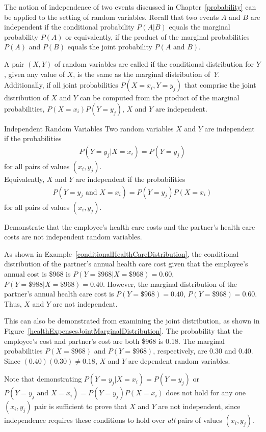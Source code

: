 The notion of independence of two events discussed in Chapter~\ref{probability} can be applied to the setting of random variables. Recall that two events $A$ and $B$ are independent if the conditional probability $P(A|B)$ equals the marginal probability $P(A)$ or equivalently, if the product of the marginal probabilities $P(A)$ and $P(B)$ equals the joint probability $P(A \text{ and }B)$.

A pair $(X,Y)$ of random variables are called  if the conditional distribution for $Y$, given any value of $X$, is the same as the marginal distribution of~$Y$. Additionally, if all joint probabilities $P(X = x_i, Y = y_j)$ that comprise the joint distribution of $X$ and $Y$ can be computed from the product of the marginal probabilities, $P(X = x_i)P(Y = y_j)$, $X$ and $Y$ are independent.

\begin{onebox}{Independent Random Variables}
Two random variables $X$ and $Y$ are independent if the probabilities
\begin{align*}
P(Y = y_j| X = x_i) = P(Y = y_j)
\end{align*}
for all pairs of values $(x_i,y_j)$. \\
Equivalently, $X$ and $Y$ are independent if the probabilities
\begin{align*}
P(Y = y_j \text{ and } X = x_i) = P(Y = y_j)P(X = x_i)
\end{align*}
for all pairs of values $(x_i,y_j)$.
\end{onebox}

\begin{examplewrap}
\begin{nexample}{Demonstrate that the employee's health care costs and the partner's health care costs are not independent random variables.}
	
	As shown in Example~\ref{conditionalHealthCareDistribution}, the conditional distribution of the partner's annual health care cost given that the employee's annual cost is \$968 is $P(Y = \$968 | X = \$ 968) = 0.60$, $P(Y = \$988 | X = \$ 968) = 0.40$. However, the marginal distribution of the partner's annual health care cost is $P(Y = \$968) = 0.40$, $P(Y = \$968) = 0.60$. Thus, $X$ and $Y$ are not independent.
	
	This can also be demonstrated from examining the joint distribution, as shown in Figure~\ref{healthExpensesJointMarginalDistribution}. The probability that the employee's cost and partner's cost are both \$968 is 0.18. The marginal probabilities $P(X = \$968)$ and $P(Y = \$968)$, respectively, are 0.30 and 0.40. Since $(0.40)(0.30) \neq 0.18$, $X$ and $Y$ are dependent random variables.
	
	Note that demonstrating $P(Y = y_j| X = x_i) = P(Y = y_j)$ or $P(Y = y_j \text{ and } X = x_i) = P(Y = y_j)P(X = x_i)$ does not hold for any one $(x_i, y_j)$ pair is sufficient to prove that $X$ and $Y$ are not independent, since independence requires these conditions to hold over \textit{all} pairs of values $(x_i, y_j)$.
\end{nexample}
\end{examplewrap}


